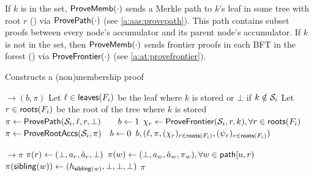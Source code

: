 If $k$ is in the set, $\mathsf{ProveMemb}(\cdot)$ sends a Merkle path to $k$'s leaf in some tree with root $r$ () via $\mathsf{ProvePath}(\cdot)$ (see \cref{a:aas:provepath}).
This path contains subset proofs between every node's accumulator and its parent node's accumulator.
If $k$ is not in the set, then $\mathsf{ProveMemb}(\cdot)$ sends frontier proofs in each BFT in the forest () via $\mathsf{ProveFrontier}(\cdot)$ (see \cref{a:at:provefrontier}).

\begin{algorithm}[H]%
    \caption{\small Constructs a (non)membership proof}
    \label{a:aas:provememb}
    \label{a:aas:provepath}
    \footnotesize
    \begin{algorithmic}[1]
     $\rightarrow (b,\pi)$
        \State Let $\ell\in \mathsf{leaves}(F_i)$ be the leaf where $k$ is stored or $\bot$ if $k\notin \mathcal{S}_i$
         
            \label{a:aas:provememb:paths-begin}
            \State Let $r\in \mathsf{roots}(F_i)$ be the root of the tree where $k$ is stored
            \State $\pi \gets \mathsf{ProvePath}(\mathcal{S}_i, \ell, r,\bot)\qquad b\gets 1$ %
            \label{a:aas:provememb:paths-end}
        \Else {}
            \label{a:aas:provememb:frontier-begin}
            \State $\chi_r\gets \mathsf{ProveFrontier}(\mathcal{S}_i,r,k),\forall r\in \mathsf{roots}(F_i)$
            \State $\pi\gets \mathsf{ProveRootAccs}(\mathcal{S}_i, \pi)\quad b\gets 0$
            \label{a:aas:provememb:frontier-end}
        \EndIf
        \State \Return $b, ( \ell, \pi, (\chi_r)_{r\in \mathsf{roots}(F_i)}, (\textcolor{black}{\psi}_r)_{r\in \mathsf{roots}(F_i)})$
    \EndFunction

     $\rightarrow \pi$
        \State $\pi(r) \gets ( \bot, \textcolor{black}{a}_r, \textcolor{black}{\hat{a}}_r, \bot)$
        \State $\pi(w) \gets ( \bot, \textcolor{black}{a}_w, \textcolor{black}{\hat{a}}_w, \textcolor{black}{\pi}_w), \forall w\in \mathsf{path}[u,r)$
        \For{$w\in \treepath[u,r)$ where $\sibling(w)\notin \dom(\pi)$}
            \State $\pi(\mathsf{sibling}(w)) \gets ( \textcolor{black}{h}_{\mathsf{sibling}(w)}, \bot,\bot,\bot)$
        \EndFor
        \State \Return $\pi$
    \EndFunction


\end{algorithmic}
\end{algorithm}
